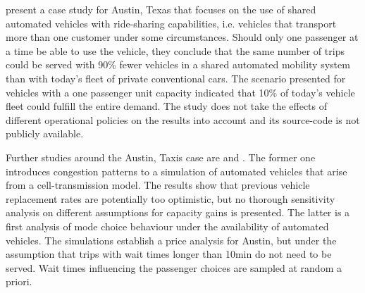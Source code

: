 
\citet{fagnant2015dynamic} present a case study for Austin, Texas that focuses on the use of shared automated vehicles with ride-sharing capabilities, i.e. vehicles that transport more than one customer under some circumstances. Should only one passenger at a time be able to use the vehicle, they conclude that the same number of trips could be served with 90\% fewer vehicles in a shared automated mobility system than with today's fleet of private conventional cars. The scenario presented for vehicles with a one passenger unit capacity indicated that 10\% of today's vehicle fleet could fulfill the entire demand. %
The study does not take the effects of different operational policies on the results into account  and its source-code is not publicly available.

Further studies around the Austin, Taxis case are \citet{review2} and \citet{review1}. The former one introduces congestion patterns to a simulation of automated vehicles that arise from a cell-transmission model. The results show that previous vehicle replacement rates are potentially too optimistic, but no thorough sensitivity analysis on different assumptions for capacity gains is presented. The latter is a first analysis of mode choice behaviour under the availability of automated vehicles. The simulations establish a price analysis for Austin, but under the assumption that trips with wait times longer than 10min do not need to be served. Wait times influencing the passenger choices are sampled at random a priori.

